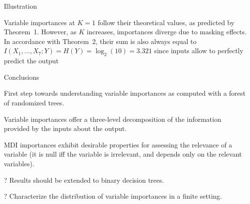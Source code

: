 \documentclass[final]{beamer}
\newcommand{\cmark}{\ding{51}}%
\begin{document}
\begin{frame}{}
\begin{textblock}{0.32}
\begin{block}{Illustration \phantom{p}}
\begin{table}
\end{table}

Variable importances at $K=1$ follow their theoretical values,
as predicted by Theorem~1. However, as $K$ increases,  importances diverge due
to masking effects. In accordance with Theorem~2, their sum is also always
equal to $I(X_{1}, \ldots, X_{7}; Y) = H(Y) = \log_{2}(10)= 3.321$ since inputs
allow to perfectly predict the output


\end{block}

\vspace{0.5cm}
\begin{block}{Conclusions \phantom{p}}

{\color{green} \cmark} First step towards understanding variable importances as computed with a forest of randomized trees.

{\color{green} \cmark} Variable importances offer a three-level decomposition of the information provided by the inputs about the output.

{\color{green} \cmark} MDI importances exhibit desirable properties for assessing the relevance of a variable (it is null iff the variable is irrelevant, and depends only on the relevant variables).

{\color{blue} ?} Results should be extended to binary decision trees.

{\color{blue} ?} Characterize the distribution of variable importances in a finite setting.


\end{block}

\end{textblock}




\end{frame}
\end{document}
